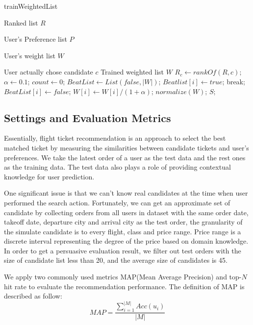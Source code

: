 \documentclass{llncs}
\begin{document}
\begin{algorithm}[htb]
\caption{trainWeightedList}
\begin{algorithmic}[1]
\label{alg:6}
\REQUIRE \par
Ranked list $R$ \par
User's Preference list $P$ \par
User's weight list $W$ \par
User actually chose candidate $c$
\ENSURE Trained weighted list $W$
\STATE $R_c \leftarrow rankOf(R,c)$;
\STATE $\alpha \leftarrow 0.1$;
\STATE $count \leftarrow 0$;
\STATE $BeatList \leftarrow List(false,|W|)$;
\STATE $Beatlist[i] \leftarrow true$;
\STATE break;
\ENDIF
\ENDFOR
{}
\STATE $BeatList[i] \leftarrow false$;
\STATE $W[i] \leftarrow W[i] / (1+\alpha)$;
\ENDIF
\ENDFOR
\ENDWHILE
\STATE $normalize(W)$;
\RETURN $S$;
\end{algorithmic} 
\end{algorithm}


\subsection{Settings and Evaluation Metrics}
Essentially, flight ticket recommendation is an approach to select the best matched ticket by measuring the similarities between candidate tickets and user's preferences. We take the latest order of a user as the test data and the rest ones as the training data. The test data also plays a role of providing contextual knowledge for user prediction.\par
One significant issue is that we can't know real candidates at the time when user performed the search action. Fortunately, we can get an approximate set of candidate by collecting orders from all users in dataset with the same order date, takeoff date, departure city and arrival city as the test order, the granularity of the simulate candidate is to every flight, class and price range. Price range is a discrete interval representing the degree of the price based on domain knowledge. In order to get a persuasive evaluation result, we filter out test orders with the size of candidate list less than 20, and the average size of candidates is 45.\par
We apply two commonly used metrics MAP(Mean Average Precision) and top-$N$ hit rate to evaluate the recommendation performance. The definition of MAP is described as follow:\\
\begin{equation}
MAP = \frac{\sum_{i=1}^{|M|}Acc(u_i)}{|M|}
\end{equation}
\end{document}
